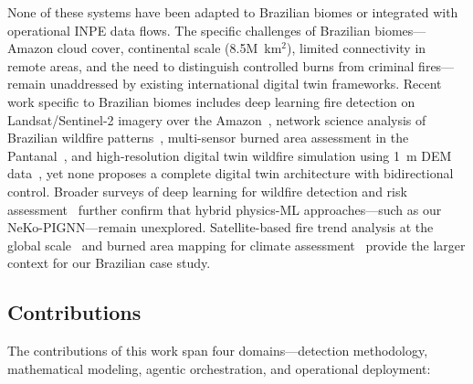 \documentclass[11pt,twocolumn,a4paper]{article}
\newcommand{\abbrev}[1]{{\small\textsc{#1}}}
\begin{document}
None of these systems have been adapted to Brazilian biomes or integrated with operational \abbrev{INPE} data flows. The specific challenges of Brazilian biomes---Amazon cloud cover, continental scale (8.5M~km$^2$), limited connectivity in remote areas, and the need to distinguish controlled burns from criminal fires---remain unaddressed by existing international digital twin frameworks. Recent work specific to Brazilian biomes includes deep learning fire detection on Landsat/Sentinel-2 imagery over the Amazon~\cite{sun2024}, network science analysis of Brazilian wildfire patterns~\cite{marli2024}, multi-sensor burned area assessment in the Pantanal~\cite{pereira2024_fire}, and high-resolution digital twin wildfire simulation using 1~m \abbrev{DEM} data~\cite{lee2026}, yet none proposes a complete digital twin architecture with bidirectional control. Broader surveys of deep learning for wildfire detection and risk assessment~\cite{ba2022_wildfire,de2023_cnn} further confirm that hybrid physics-ML approaches---such as our NeKo-PIGNN---remain unexplored. Satellite-based fire trend analysis at the global scale~\cite{andela2023_human} and burned area mapping for climate assessment~\cite{lizundia2024_fire} provide the larger context for our Brazilian case study.

\subsection{Contributions}

The contributions of this work span four domains---detection methodology, mathematical modeling, agentic orchestration, and operational deployment:
\end{document}
